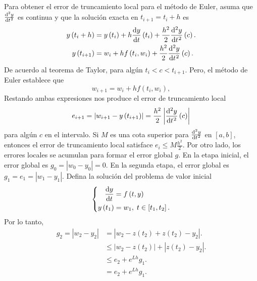 Para obtener el error de truncamiento local para el método de Euler,
asuma que $\diff[2]{y}{t}$ es continua y que la solución exacta en
$t_{i+1}=t_{i}+h$ es
\begin{align*}
    y\left(t_{i}+h\right) & =
    y\left(t_{i}\right)+
    h\diff{y}{t}\left(t_{i}\right)+
    \frac{h^{2}}{2}
    \diff[2]{y}{t}\left(c\right). \\
    y\left(t_{i+1}\right) & =
    w_{i}+hf\left(t_{i},w_{i}\right)+
    \frac{h^{2}}{2}
    \diff[2]{y}{t}\left(c\right).
\end{align*}
De acuerdo al teorema de Taylor, para algún $t_{i}<c<t_{i+1}$.
Pero, el método de Euler establece que
\begin{equation*}
    w_{i+1}=w_{i}+hf\left(t_{i},w_{i}\right),
\end{equation*}
Restando ambas expresiones nos produce el error de truncamiento local
\begin{equation*}
    e_{i+1}=\left|w_{i+1}-y\left(t_{i+1}\right)\right|=
    \frac{h^{2}}{2}\left|\diff[2]{y}{t}\left(c\right)\right|
\end{equation*}
para algún $c$ en el intervalo.
Si $M$ es una cota superior para $\diff[2]{y}{t}$ en
$\left[a,b\right]$, entonces el error de truncamiento local satisface
$e_{i}\leq M\frac{h^{2}}{2}$.
Por otro lado, los errores locales se acumulan para formar el error
global $g$.
En la etapa inicial, el error global es
$g_{0}=\left|w_{0}-y_{0}\right|=0$.
En la segunda etapa, el error global es
$g_{1}=e_{1}=\left|w_{1}-y_{1}\right|$.
Defina la solución del problema de valor inicial
\begin{equation*}
    \left\{
    \begin{aligned}
        \diff{y}{t}         & =
        f\left(t,y\right)       \\
        y\left(t_{1}\right) & =
        w_{1},\; t\in\left[t_{1},t_{2}\right].
    \end{aligned}
    \right.
\end{equation*}
Por lo tanto,
\begin{align*}
    g_{2}=
    \left|
    w_{2}-
    y_{2}
    \right| & =
    \left|
    w_{2}-
    z\left(t_{2}\right)+
    z\left(t_{2}\right)-
    y_{2}
    \right|.                                \\
            & \leq
    \left|w_{2}-z\left(t_{2}\right)\right|+
    \left|z\left(t_{2}\right)-y_{2}\right|. \\
            & \leq
    e_{2}+
    e^{Lh}g_{1}.                            \\
            & =
    e_{2}+
    e^{Lh}g_{1}.
\end{align*}
